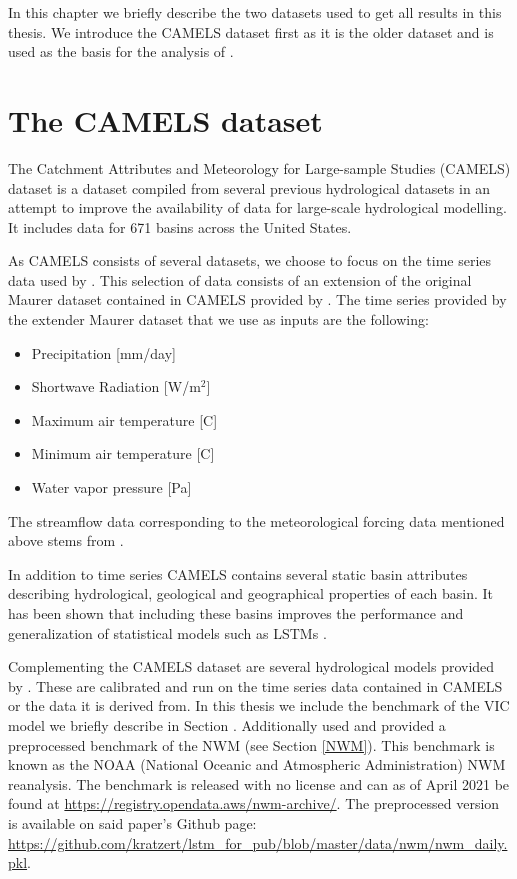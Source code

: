 In this chapter we briefly describe the two datasets used to get all results in 
this thesis. We introduce the CAMELS dataset \citep{CAMELS_US} first as it is the 
older dataset and is used as the basis for the analysis of \citet{lstm_first_paper, lstm_second_paper, lstm_third_paper}.
\section{The CAMELS dataset}
The Catchment Attributes and Meteorology for Large-sample Studies (CAMELS) dataset \citep{CAMELS_US}
is a dataset compiled from several previous hydrological datasets in an attempt to 
improve the availability of data for large-scale hydrological modelling. It includes 
data for 671 basins across the United States. 

As CAMELS consists of several datasets, we choose to focus on the time series data 
used by \citet{lstm_second_paper}. This selection of data consists of an extension 
of the original Maurer dataset contained in CAMELS provided by \citet{maurer_hydroshare}.
The time series provided by the extender Maurer dataset that we use as inputs are 
the following:
\begin{itemize}
    \item Precipitation [mm/day]
    \item Shortwave Radiation [W/m$^2$]
    \item Maximum air temperature [C\degree]
    \item Minimum air temperature [C\degree]
    \item Water vapor pressure [Pa]
\end{itemize}

The streamflow data corresponding to the meteorological forcing data mentioned above 
stems from \citet{usgs_streamflow}.

In addition to time series CAMELS contains several static basin attributes describing 
hydrological, geological and geographical properties of each basin. It has been 
shown that including these basins improves the performance and generalization of 
statistical models such as LSTMs \cite{lstm_second_paper}. 

Complementing the CAMELS dataset are several hydrological models provided by \citet{CAMELS_hydroshare}. 
These are calibrated and run on the time series data contained in CAMELS or the data 
it is derived from. In this thesis we include the benchmark of the VIC model we 
briefly describe in Section \cite{VIC}. Additionally \citet{lstm_third_paper} used 
and provided a preprocessed  benchmark of the NWM (see Section \ref{NWM}). 
This benchmark is known as the 
NOAA (National Oceanic and Atmospheric Administration) NWM reanalysis. The benchmark 
is released with no license and can as of April 2021  be found at 
\url{https://registry.opendata.aws/nwm-archive/}.
The preprocessed version is available on said paper's 
Github page: \url{https://github.com/kratzert/lstm_for_pub/blob/master/data/nwm/nwm_daily.pkl}.


